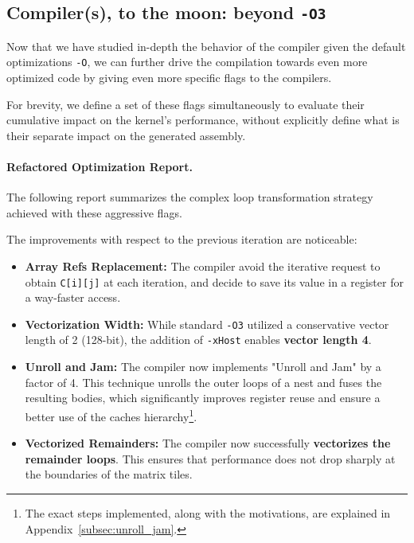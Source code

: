 
\subsection{Compiler(s), to the moon: beyond \texttt{-O3}}

Now that we have studied in-depth the behavior of the compiler given the default optimizations \texttt{-O}, we can further drive the compilation towards even more optimized code by giving even more specific flags to the compilers. 

For brevity, we define a set of these flags simultaneously to evaluate their cumulative impact on the kernel's performance, without explicitly define what is their separate impact on the generated assembly.


\paragraph{Refactored Optimization Report.}
The following report summarizes the complex loop transformation strategy achieved with these aggressive flags.


The improvements with respect to the previous iteration are noticeable:

\begin{itemize}
    \item \textbf{Array Refs Replacement:} The compiler avoid the iterative request to obtain \texttt{C[i][j]} at each iteration, and decide to save its value in a register for a way-faster access.

    \item \textbf{Vectorization Width:} While standard \texttt{-O3} utilized a conservative vector length of 2 (128-bit), the addition of \texttt{-xHost} enables \textbf{vector length 4}.
    \item \textbf{Unroll and Jam:} The compiler now implements "Unroll and Jam" by a factor of 4. This technique unrolls the outer loops of a nest and fuses the resulting bodies, which significantly improves register reuse and ensure  a better use of the caches hierarchy\footnote{The exact steps implemented, along with the motivations, are explained in Appendix~\ref{subsec:unroll_jam}.}.
    \item \textbf{Vectorized Remainders:} The compiler now successfully \textbf{vectorizes the remainder loops}. This ensures that performance does not drop sharply at the boundaries of the matrix tiles.
\end{itemize}

